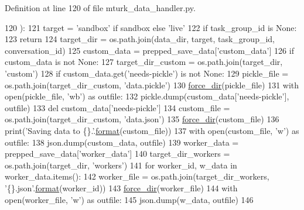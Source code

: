 Definition at line 120 of file mturk\+\_\+data\+\_\+handler.\+py.


\begin{DoxyCode}
120     ):
121         target = \textcolor{stringliteral}{'sandbox'} \textcolor{keywordflow}{if} sandbox \textcolor{keywordflow}{else} \textcolor{stringliteral}{'live'}
122         \textcolor{keywordflow}{if} task\_group\_id \textcolor{keywordflow}{is} \textcolor{keywordtype}{None}:
123             \textcolor{keywordflow}{return}
124         target\_dir = os.path.join(data\_dir, target, task\_group\_id, conversation\_id)
125         custom\_data = prepped\_save\_data[\textcolor{stringliteral}{'custom\_data'}]
126         \textcolor{keywordflow}{if} custom\_data \textcolor{keywordflow}{is} \textcolor{keywordflow}{not} \textcolor{keywordtype}{None}:
127             target\_dir\_custom = os.path.join(target\_dir, \textcolor{stringliteral}{'custom'})
128             \textcolor{keywordflow}{if} custom\_data.get(\textcolor{stringliteral}{'needs-pickle'}) \textcolor{keywordflow}{is} \textcolor{keywordflow}{not} \textcolor{keywordtype}{None}:
129                 pickle\_file = os.path.join(target\_dir\_custom, \textcolor{stringliteral}{'data.pickle'})
130                 \hyperlink{namespaceparlai_1_1mturk_1_1core_1_1mturk__data__handler_a28ec50366a486cded72d95c9be461c2f}{force\_dir}(pickle\_file)
131                 with open(pickle\_file, \textcolor{stringliteral}{'wb'}) \textcolor{keyword}{as} outfile:
132                     pickle.dump(custom\_data[\textcolor{stringliteral}{'needs-pickle'}], outfile)
133                 del custom\_data[\textcolor{stringliteral}{'needs-pickle'}]
134             custom\_file = os.path.join(target\_dir\_custom, \textcolor{stringliteral}{'data.json'})
135             \hyperlink{namespaceparlai_1_1mturk_1_1core_1_1mturk__data__handler_a28ec50366a486cded72d95c9be461c2f}{force\_dir}(custom\_file)
136             print(\textcolor{stringliteral}{'Saving data to \{\}.'}.\hyperlink{namespaceparlai_1_1chat__service_1_1services_1_1messenger_1_1shared__utils_a32e2e2022b824fbaf80c747160b52a76}{format}(custom\_file))
137             with open(custom\_file, \textcolor{stringliteral}{'w'}) \textcolor{keyword}{as} outfile:
138                 json.dump(custom\_data, outfile)
139         worker\_data = prepped\_save\_data[\textcolor{stringliteral}{'worker\_data'}]
140         target\_dir\_workers = os.path.join(target\_dir, \textcolor{stringliteral}{'workers'})
141         \textcolor{keywordflow}{for} worker\_id, w\_data \textcolor{keywordflow}{in} worker\_data.items():
142             worker\_file = os.path.join(target\_dir\_workers, \textcolor{stringliteral}{'\{\}.json'}.\hyperlink{namespaceparlai_1_1chat__service_1_1services_1_1messenger_1_1shared__utils_a32e2e2022b824fbaf80c747160b52a76}{format}(worker\_id))
143             \hyperlink{namespaceparlai_1_1mturk_1_1core_1_1mturk__data__handler_a28ec50366a486cded72d95c9be461c2f}{force\_dir}(worker\_file)
144             with open(worker\_file, \textcolor{stringliteral}{'w'}) \textcolor{keyword}{as} outfile:
145                 json.dump(w\_data, outfile)
146 
\end{DoxyCode}


